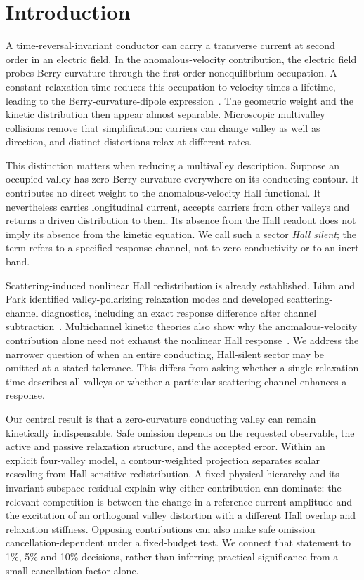 \section{Introduction}
A time-reversal-invariant conductor can carry a transverse current at second order in an electric field. In the anomalous-velocity contribution, the electric field probes Berry curvature through the first-order nonequilibrium occupation. A constant relaxation time reduces this occupation to velocity times a lifetime, leading to the Berry-curvature-dipole expression~\cite{SodemannFu2015}. The geometric weight and the kinetic distribution then appear almost separable. Microscopic multivalley collisions remove that simplification: carriers can change valley as well as direction, and distinct distortions relax at different rates.

This distinction matters when reducing a multivalley description. Suppose an occupied valley has zero Berry curvature everywhere on its conducting contour. It contributes no direct weight to the anomalous-velocity Hall functional. It nevertheless carries longitudinal current, accepts carriers from other valleys and returns a driven distribution to them. Its absence from the Hall readout does not imply its absence from the kinetic equation. We call such a sector \emph{Hall silent}; the term refers to a specified response channel, not to zero conductivity or to an inert band.

Scattering-induced nonlinear Hall redistribution is already established. Lihm and Park identified valley-polarizing relaxation modes and developed scattering-channel diagnostics, including an exact response difference after channel subtraction~\cite{LihmPark2024}. Multichannel kinetic theories also show why the anomalous-velocity contribution alone need not exhaust the nonlinear Hall response~\cite{NandySodemann2019,Du2019}. We address the narrower question of when an entire conducting, Hall-silent sector may be omitted at a stated tolerance. This differs from asking whether a single relaxation time describes all valleys or whether a particular scattering channel enhances a response.

Our central result is that a zero-curvature conducting valley can remain kinetically indispensable. Safe omission depends on the requested observable, the active and passive relaxation structure, and the accepted error. Within an explicit four-valley model, a contour-weighted projection separates scalar rescaling from Hall-sensitive redistribution. A fixed physical hierarchy and its invariant-subspace residual explain why either contribution can dominate: the relevant competition is between the change in a reference-current amplitude and the excitation of an orthogonal valley distortion with a different Hall overlap and relaxation stiffness. Opposing contributions can also make safe omission cancellation-dependent under a fixed-budget test. We connect that statement to 1\%, 5\% and 10\% decisions, rather than inferring practical significance from a small cancellation factor alone.

